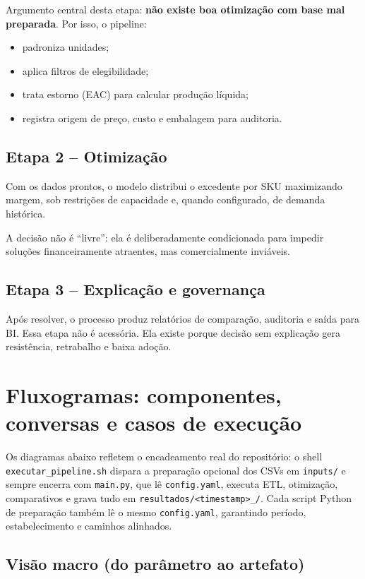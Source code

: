 \documentclass[11pt,a4paper]{article}
\begin{document}
Argumento central desta etapa: \textbf{não existe boa otimização com base
mal preparada}. Por isso, o pipeline:
\begin{itemize}[leftmargin=1.2cm]
    \item padroniza unidades;
    \item aplica filtros de elegibilidade;
    \item trata estorno (EAC) para calcular produção líquida;
    \item registra origem de preço, custo e embalagem para auditoria.
\end{itemize}

\subsection{Etapa 2 -- Otimização}

Com os dados prontos, o modelo distribui o excedente por SKU maximizando margem,
sob restrições de capacidade e, quando configurado, de demanda histórica.

A decisão não é ``livre'': ela é deliberadamente condicionada para impedir
soluções financeiramente atraentes, mas comercialmente inviáveis.

\subsection{Etapa 3 -- Explicação e governança}

Após resolver, o processo produz relatórios de comparação, auditoria e saída para
BI. Essa etapa não é acessória. Ela existe porque decisão sem explicação gera
resistência, retrabalho e baixa adoção.

\section{Fluxogramas: componentes, conversas e casos de execução}

Os diagramas abaixo refletem o encadeamento real do repositório: o shell
\texttt{executar\_pipeline.sh} dispara a preparação opcional dos CSVs em
\texttt{inputs/} e sempre encerra com \texttt{main.py}, que lê
\texttt{config.yaml}, executa ETL, otimização, comparativos e grava tudo em
\texttt{resultados/<timestamp>\_<D|S|M>/}. Cada script Python de preparação também lê o
mesmo \texttt{config.yaml}, garantindo período, estabelecimento e caminhos
alinhados.

\subsection{Visão macro (do parâmetro ao artefato)}
\end{document}
